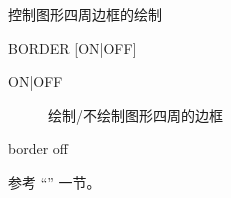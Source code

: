 \label{cmd:border}

控制图形四周边框的绘制

\begin{SACSTX}
BORDER [ON|OFF]
\end{SACSTX}

\begin{description}
\item [ON|OFF] 绘制/不绘制图形四周的边框
\end{description}

\begin{SACDFT}
border off
\end{SACDFT}

参考 ``'' 一节。
